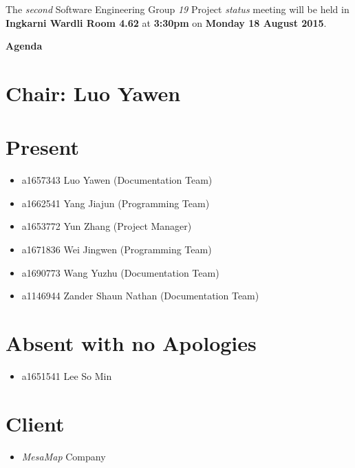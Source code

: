 \documentclass[a4paper] {article}
\begin{document}
	
	\vspace*{-50pt}
	
	\noindent The \emph{second} Software Engineering Group \emph{19} Project \emph{status} meeting will
	be held in \textbf{Ingkarni Wardli Room 4.62} at \textbf {3:30pm} on \textbf{Monday 18 August 2015}.
	
	
	\begin{center}
		\huge \textbf {Agenda}
	\end{center}
	
	
	
	\section*{Chair: Luo Yawen}
	
	\vspace*{10pt}
	
	\section{Present}
	\begin{itemize}
		\item a1657343 Luo Yawen (Documentation Team)
		\item a1662541 Yang Jiajun (Programming Team)
		\item a1653772 Yun Zhang (Project Manager)
		\item a1671836 Wei Jingwen (Programming Team)
		\item a1690773 Wang Yuzhu (Documentation Team)
		\item a1146944 Zander Shaun Nathan (Documentation Team)
	\end{itemize}
	
	\section{Absent with no Apologies}
	\begin{itemize}
		\item a1651541 Lee So Min
	\end{itemize}  
	
        \section{Client}
        \begin{itemize}
            \item \emph{MesaMap} Company
        \end{itemize} 
	
\end{document}

